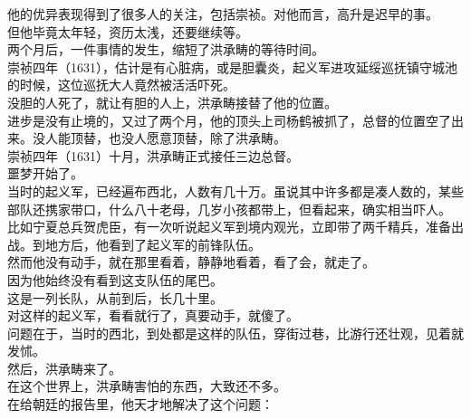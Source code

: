 \begin{multicols}{\theparacolNo}
他的优异表现得到了很多人的关注，包括崇祯。对他而言，高升是迟早的事。\\

但他毕竟太年轻，资历太浅，还要继续等。\\

两个月后，一件事情的发生，缩短了洪承畴的等待时间。\\

崇祯四年（1631），估计是有心脏病，或是胆囊炎，起义军进攻延绥巡抚镇守城池的时候，这位巡抚大人竟然被活活吓死。\\

没胆的人死了，就让有胆的人上，洪承畴接替了他的位置。\\

进步是没有止境的，又过了两个月，他的顶头上司杨鹤被抓了，总督的位置空了出来。没人能顶替，也没人愿意顶替，除了洪承畴。\\

崇祯四年（1631）十月，洪承畴正式接任三边总督。\\

噩梦开始了。\\

当时的起义军，已经遍布西北，人数有几十万。虽说其中许多都是凑人数的，某些部队还携家带口，什么八十老母，几岁小孩都带上，但看起来，确实相当吓人。\\

比如宁夏总兵贺虎臣，有一次听说起义军到境内观光，立即带了两千精兵，准备出战。到地方后，他看到了起义军的前锋队伍。\\

然而他没有动手，就在那里看着，静静地看着，看了会，就走了。\\

因为他始终没有看到这支队伍的尾巴。\\

这是一列长队，从前到后，长几十里。\\

对这样的起义军，看看就行了，真要动手，就傻了。\\

问题在于，当时的西北，到处都是这样的队伍，穿街过巷，比游行还壮观，见着就发怵。\\

然后，洪承畴来了。\\

在这个世界上，洪承畴害怕的东西，大致还不多。\\

在给朝廷的报告里，他天才地解决了这个问题：\\


\end{multicols}
